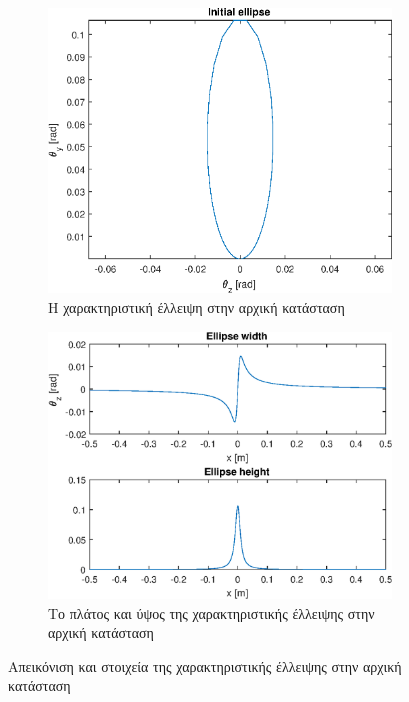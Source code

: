 \begin{figure}[tph]	
	\begin{subfigure}{0.47\textwidth}
		\includegraphics[width=\linewidth]{figures/MATLAB-variable-analysis/initial-ellipse}
		\centering
		\caption{Η χαρακτηριστική έλλειψη στην αρχική κατάσταση}
		\label{fig:MATLAB-variable-analysis-initial-ellipse}
	\end{subfigure}
	\hfill
	\begin{subfigure}{0.47\textwidth}
		\includegraphics[width=\linewidth]{figures/MATLAB-variable-analysis/initial-ellipse-height-width}
		\centering
		\caption{Το πλάτος και ύψος της χαρακτηριστικής έλλειψης στην αρχική κατάσταση}
		\label{fig:MATLAB-variable-analysis-initial-ellipse-height-width}
	\end{subfigure}
\caption{Απεικόνιση και στοιχεία της χαρακτηριστικής έλλειψης στην αρχική κατάσταση}
\label{fig:MATLAB-initial-ellipse}
\end{figure}

